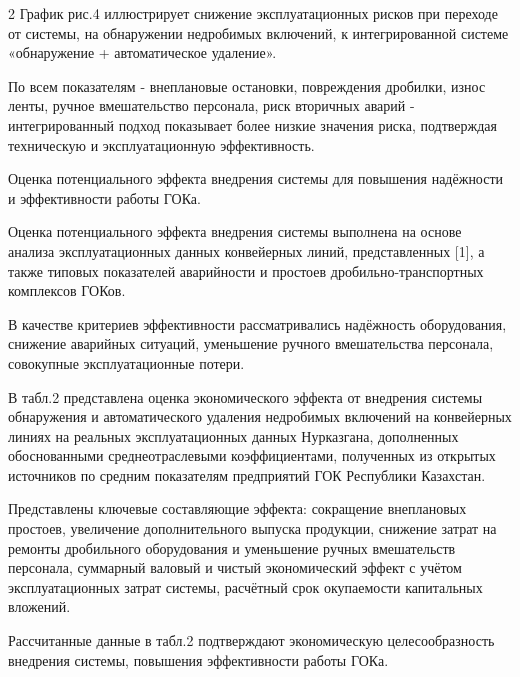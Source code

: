 \begin{multicols}{2}
График рис.4 иллюстрирует снижение эксплуатационных рисков при переходе
от системы, на обнаружении недробимых включений, к интегрированной
системе «обнаружение + автоматическое удаление».

По всем показателям - внеплановые остановки, повреждения дробилки, износ
ленты, ручное вмешательство персонала, риск вторичных аварий -
интегрированный подход показывает более низкие значения риска,
подтверждая техническую и эксплуатационную эффективность.

Оценка потенциального эффекта внедрения системы для повышения
надёжности и эффективности работы ГОКа.

Оценка потенциального эффекта внедрения системы выполнена на основе
анализа эксплуатационных данных конвейерных линий, представленных
{[}1{]}, а также типовых показателей аварийности и простоев
дробильно-транспортных комплексов ГОКов.

В качестве критериев эффективности рассматривались надёжность
оборудования, снижение аварийных ситуаций, уменьшение ручного
вмешательства персонала, совокупные эксплуатационные потери.

В табл.2 представлена оценка экономического эффекта от внедрения системы
обнаружения и автоматического удаления недробимых включений на
конвейерных линиях на реальных эксплуатационных данных Нурказгана,
дополненных обоснованными среднеотраслевыми коэффициентами, полученных
из открытых источников по средним показателям предприятий ГОК Республики
Казахстан.

Представлены ключевые составляющие эффекта: сокращение внеплановых
простоев, увеличение дополнительного выпуска продукции, снижение затрат
на ремонты дробильного оборудования и уменьшение ручных вмешательств
персонала, суммарный валовый и чистый экономический эффект с учётом
эксплуатационных затрат системы, расчётный срок окупаемости капитальных
вложений.

Рассчитанные данные в табл.2 подтверждают экономическую целесообразность
внедрения системы, повышения эффективности работы ГОКа.
\end{multicols}

